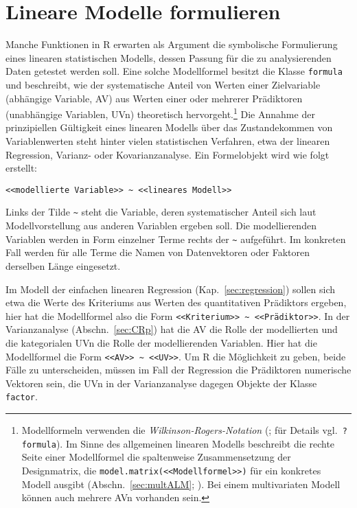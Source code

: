\section{Lineare Modelle formulieren}
\label{sec:formula}

Manche Funktionen in R erwarten als Argument die symbolische Formulierung eines linearen statistischen Modells, dessen Passung für die zu analysierenden Daten getestet werden soll. Eine solche Modellformel besitzt die Klasse \lstinline!formula! und beschreibt, wie der systematische Anteil von Werten einer Zielvariable (abhängige Variable, AV) aus Werten einer oder mehrerer Prädiktoren (unabhängige Variablen, UVn) theoretisch hervorgeht.\footnote{Modellformeln verwenden die \emph{Wilkinson-Rogers-Notation} (; für Details vgl.\ \lstinline!?formula!). Im Sinne des allgemeinen linearen Modells beschreibt die rechte Seite einer Modellformel die spaltenweise Zusammensetzung der Designmatrix, die \lstinline!model.matrix(<<Modellformel>>)! für ein konkretes Modell ausgibt (Abschn.\ \ref{sec:multALM}; ). Bei einem multivariaten Modell können auch mehrere AVn vorhanden sein.} Die Annahme der prinzipiellen Gültigkeit eines linearen Modells über das Zustandekommen von Variablenwerten steht hinter vielen statistischen Verfahren, etwa der linearen Regression, Varianz- oder Kovarianzanalyse. Ein Formelobjekt wird wie folgt erstellt:
\begin{lstlisting}
<<modellierte Variable>> ~ <<lineares Modell>>
\end{lstlisting}

Links der Tilde \lstinline!~! steht die Variable, deren systematischer Anteil sich laut Modellvorstellung aus anderen Variablen ergeben soll. Die modellierenden Variablen werden in Form einzelner Terme rechts der \lstinline!~! aufgeführt. Im konkreten Fall werden für alle Terme die Namen von Datenvektoren oder Faktoren derselben Länge eingesetzt.

Im Modell der einfachen linearen Regression (Kap.\ \ref{sec:regression}) sollen sich etwa die Werte des Kriteriums aus Werten des quantitativen Prädiktors ergeben, hier hat die Modellformel also die Form \lstinline!<<Kriterium>> ~ <<Prädiktor>>!. In der Varianzanalyse (Abschn.\ \ref{sec:CRp}) hat die AV die Rolle der modellierten und die kategorialen UVn die Rolle der modellierenden Variablen. Hier hat die Modellformel die Form \lstinline!<<AV>> ~ <<UV>>!. Um R die Möglichkeit zu geben, beide Fälle zu unterscheiden, müssen im Fall der Regression die Prädiktoren numerische Vektoren sein, die UVn in der Varianzanalyse dagegen Objekte der Klasse \lstinline!factor!.

